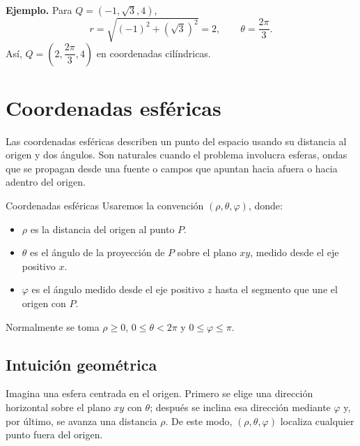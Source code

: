 \textbf{Ejemplo.} Para $Q=(-1,\sqrt{3},4)$,
\[
r=\sqrt{(-1)^2+(\sqrt{3})^2}=2,
\qquad
\theta=\frac{2\pi}{3}.
\]
Así, $Q=\left(2,\dfrac{2\pi}{3},4\right)$ en coordenadas cilíndricas.

\section{Coordenadas esféricas}

Las coordenadas esféricas describen un punto del espacio usando su distancia al origen y dos ángulos. Son naturales cuando el problema involucra esferas, ondas que se propagan desde una fuente o campos que apuntan hacia afuera o hacia adentro del origen.

\begin{mydefinition}{Coordenadas esféricas}
Usaremos la convención $(\rho,\theta,\varphi)$, donde:
\begin{itemize}
    \item $\rho$ es la distancia del origen al punto $P$.
    \item $\theta$ es el ángulo de la proyección de $P$ sobre el plano $xy$, medido desde el eje positivo $x$.
    \item $\varphi$ es el ángulo medido desde el eje positivo $z$ hasta el segmento que une el origen con $P$.
\end{itemize}
Normalmente se toma $\rho\geq 0$, $0\leq\theta<2\pi$ y $0\leq\varphi\leq\pi$.
\end{mydefinition}

\subsection{Intuición geométrica}

Imagina una esfera centrada en el origen. Primero se elige una dirección horizontal sobre el plano $xy$ con $\theta$; después se inclina esa dirección mediante $\varphi$ y, por último, se avanza una distancia $\rho$. De este modo, $(\rho,\theta,\varphi)$ localiza cualquier punto fuera del origen.


